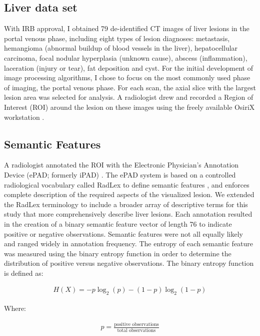 \subsection{Liver data set}
With IRB approval, I obtained 79 de-identified CT images of liver lesions in the portal venous phase, including eight types of lesion diagnoses: metastasis, hemangioma (abnormal buildup of blood vessels in the liver), hepatocellular carcinoma, focal nodular hyperplasia (unknown cause), abscess (inflammation), laceration (injury or tear), fat deposition and cyst. For the initial development of image processing algorithms, I chose to focus on the most commonly used phase of imaging, the portal venous phase. For each scan, the axial slice with the largest lesion area was selected for analysis. A radiologist drew and recorded a Region of Interest (ROI) around the lesion on these images using the freely available OsiriX workstation \cite{Armato:2007ks,Rosset:2004kk}.


\subsection{Semantic Features}
A radiologist annotated the ROI with the Electronic Physician's Annotation Device (ePAD; formerly iPAD) \cite{Napel:2010vb, Rubin:2008uz}. The ePAD system is based on a controlled radiological vocabulary called RadLex to define semantic features \cite{Korenblum:2011gx, Langlotz:2006jn}, and enforces complete description of the required aspects of the visualized lesion. We extended the RadLex terminology to include a broader array of descriptive terms for this study that more comprehensively describe liver lesions. Each annotation resulted in the creation of a binary semantic feature vector of length 76 to indicate positive or negative observations.
Semantic features were not all equally likely and ranged widely in annotation frequency. The entropy of each semantic feature was measured using the binary entropy function in order to determine the distribution of positive versus negative observations. The binary entropy function is defined as:

\begin{align}
H(X) = -p\log_2(p) - (1-p)\log_2(1-p)
\end{align}

Where:

\begin{align}
p = \frac{\textrm{positive observations}}{\textrm{total observations}}
\end{align}

